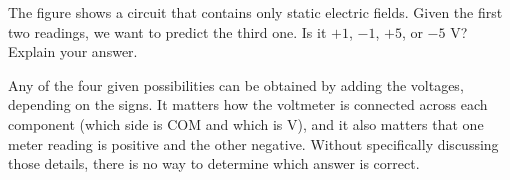 The figure shows a circuit
that contains only static electric fields.
Given the first two readings, we want to predict the third one.
Is it $+1$, $-1$, $+5$, or $-5$ V? Explain your answer.

Any of the four given possibilities can be obtained by adding the
voltages, depending on the signs. It matters how the voltmeter is
connected across each component (which side is COM and which is V),
and it also matters that one meter reading is positive and the other
negative. Without specifically discussing those details, there is no
way to determine which answer is correct.
